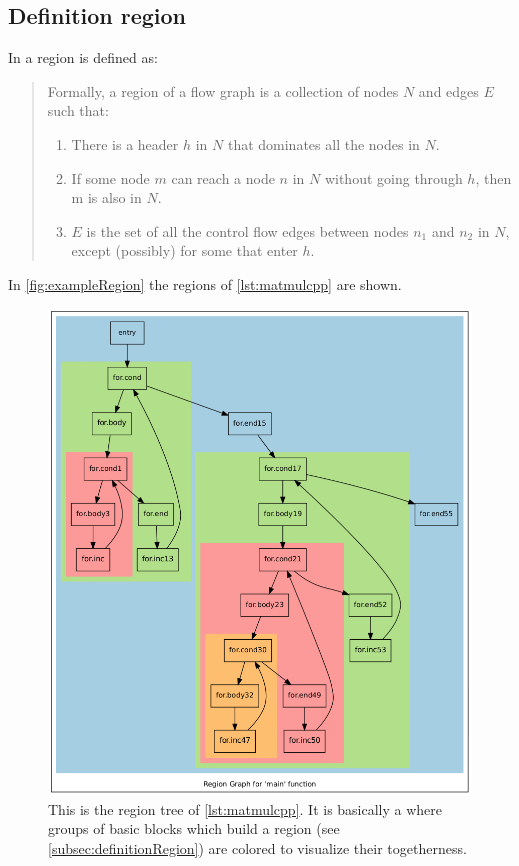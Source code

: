 \subsection{Definition region}\label{subsec:definitionRegion}
In \cite[chapter 9.7.1, p.~672]{Drachenbuch} a region is defined as:

\begin{quotation}
    Formally, a region of a flow graph is a collection of nodes \(N\) and edges \(E\) such that:
    \begin{enumerate}
        \item There is a header \(h\) in \(N\) that dominates all the nodes in \(N\).
        \item If some node \(m\) can reach a node \(n\) in \(N\) without going through \(h\), then m is also in \(N\).
        \item \(E\) is the set of all the control flow edges between nodes \(n_1\) and \(n_2\) in \(N\), except (possibly) for some that enter \(h\).
    \end{enumerate}
\end{quotation}
In \autoref{fig:exampleRegion} the regions of \autoref{lst:matmulcpp} are shown.
\begin{figure}[!h]
    \centering
    \caption[The region tree of \autoref{lst:matmulcpp}]{
        This is the region tree of \autoref{lst:matmulcpp}.
        It is basically a \cfg where groups of basic blocks which build a region (see \autoref{subsec:definitionRegion}) are colored to visualize their togetherness.
    }
    \label{fig:exampleRegion}
    \includegraphics[width=\textwidth]{gfx/matmulRegions.png}
\end{figure}
